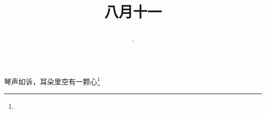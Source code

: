 \title{\date[d=13,m=9,y=2024][year:cn-y,年,month:cn,day:cn,日,·,weekday]·八月十一 }
琴声如诉，耳朵里空有一颗心\footnote{ }

